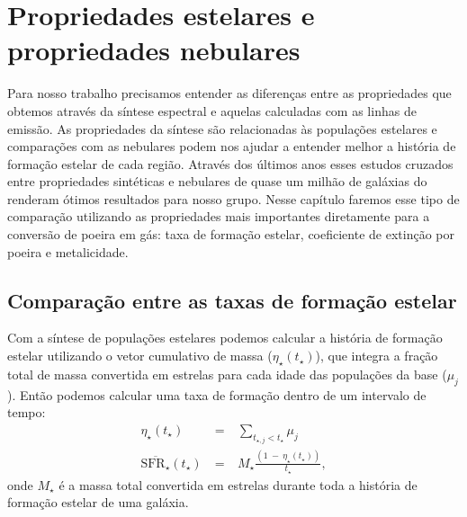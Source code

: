 


\chapter{Propriedades estelares e propriedades nebulares}
\label{sec:synvsneb}

Para nosso trabalho precisamos entender as diferenças entre as propriedades que obtemos através da
síntese espectral e aquelas calculadas com as linhas de emissão. As propriedades da síntese são
relacionadas às populações estelares e comparações com as nebulares podem nos ajudar a entender
melhor a história de formação estelar de cada região. Através dos últimos anos esses estudos
cruzados entre propriedades sintéticas e nebulares de quase um milhão de galáxias do \SDSS renderam
ótimos resultados para nosso grupo. Nesse capítulo faremos esse tipo de comparação utilizando as
propriedades mais importantes diretamente para a conversão de poeira em gás: taxa de formação
estelar, coeficiente de extinção por poeira e metalicidade.

\section{Comparação entre as taxas de formação estelar}
\label{sec:synvsneb:SFR}

Com a síntese de populações estelares podemos calcular a história de formação estelar utilizando o
vetor cumulativo de massa ($\eta_\star(t_\star)$), que integra a fração total de massa convertida em
estrelas para cada idade das populações da base ($\mu_j$). Então podemos calcular uma taxa de
formação dentro de um intervalo de tempo:
\begin{eqnarray}
	\eta_\star(t_\star)\ &=&\ \sum\limits_{t_{\star,j} < t_\star} \mu_j \\
	\overline{\mathrm{SFR}_\star}(t_\star)\ &=&\ M_\star \frac{(1\ -\ \eta_\star(t_\star))}{t_\star},
\end{eqnarray}
\noindent onde $M_\star$ é a massa total convertida em estrelas durante toda a história de
formação estelar de uma galáxia. 

